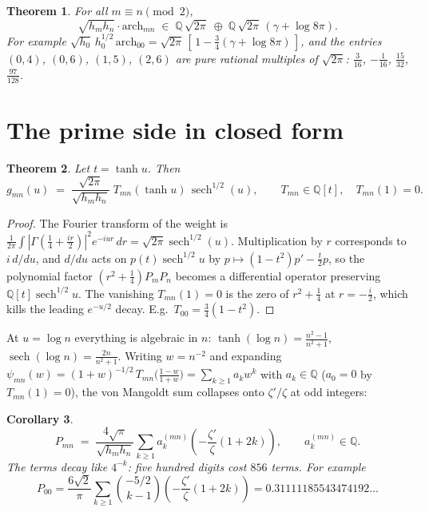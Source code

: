 \documentclass[11pt,a4paper]{article}
\newtheorem{theorem}{Theorem}[section]
\newtheorem{corollary}[theorem]{Corollary}
\theoremstyle{definition}
\newcommand{\Q}{\mathbb{Q}}
\newcommand{\G}{\Gamma}
\begin{document}
\begin{theorem}\label{thm:arch}
For all $m \equiv n \pmod 2$,
\[
\sqrt{h_m h_n}\cdot \mathrm{arch}_{mn} \;\in\;
\Q\,\sqrt{2\pi} \;\oplus\; \Q\,\sqrt{2\pi}\,(\gamma + \log 8\pi).
\]
For example $\sqrt{h_0}\,h_0^{1/2}\,\mathrm{arch}_{00} =
\sqrt{2\pi}\,[\,1 - \tfrac34(\gamma + \log 8\pi)\,]$, and the entries
$(0,4)$, $(0,6)$, $(1,5)$, $(2,6)$ are pure rational multiples of
$\sqrt{2\pi}$: $\tfrac3{16}$, $-\tfrac1{16}$, $\tfrac{15}{32}$,
$\tfrac{97}{128}$.
\end{theorem}

\section{The prime side in closed form}

\begin{theorem}\label{thm:closed}
Let $t = \tanh u$. Then
\[
g_{mn}(u) \;=\; \frac{\sqrt{2\pi}}{\sqrt{h_m h_n}}\;
T_{mn}(\tanh u)\,\operatorname{sech}^{1/2}(u),
\qquad T_{mn} \in \Q[t], \quad T_{mn}(1) = 0 .
\]
\end{theorem}

\begin{proof}
The Fourier transform of the weight is
$\tfrac1{2\pi}\int |\G(\tfrac14+\tfrac{ir}2)|^2 e^{-iur}\,dr =
\sqrt{2\pi}\operatorname{sech}^{1/2}(u)$. Multiplication by $r$
corresponds to $i\,d/du$, and $d/du$ acts on
$p(t)\operatorname{sech}^{1/2}u$ by
$p \mapsto (1-t^2)p' - \tfrac t2 p$, so the polynomial factor
$(r^2+\tfrac14)P_m P_n$ becomes a differential operator preserving
$\Q[t]\operatorname{sech}^{1/2}u$. The vanishing $T_{mn}(1) = 0$
is the zero of $r^2 + \tfrac14$ at $r = -\tfrac i2$, which kills
the leading $e^{-u/2}$ decay. E.g.\ $T_{00} = \tfrac34(1-t^2)$.
\end{proof}

At $u = \log n$ everything is algebraic in $n$: $\tanh(\log n) =
\tfrac{n^2-1}{n^2+1}$, $\operatorname{sech}(\log n) =
\tfrac{2n}{n^2+1}$. Writing $w = n^{-2}$ and expanding
$\psi_{mn}(w) = (1+w)^{-1/2}\,T_{mn}\bigl(\tfrac{1-w}{1+w}\bigr) =
\sum_{k\ge1} a_k w^k$ with $a_k \in \Q$ ($a_0 = 0$ by
$T_{mn}(1)=0$), the von Mangoldt sum collapses onto
$\zeta'/\zeta$ at odd integers:

\begin{corollary}\label{cor:series}
\[
P_{mn} \;=\; \frac{4\sqrt\pi}{\sqrt{h_m h_n}}
\sum_{k\ge1} a_k^{(mn)}
\left(-\frac{\zeta'}{\zeta}(1+2k)\right),
\qquad a_k^{(mn)} \in \Q .
\]
The terms decay like $4^{-k}$: five hundred digits cost $856$
terms. For example
\[
P_{00} = \frac{6\sqrt2}\pi \sum_{k\ge1}
\binom{-5/2}{\,k-1}\left(-\frac{\zeta'}\zeta(1+2k)\right)
= 0.31111185543474192\ldots
\]
\end{corollary}
\end{document}
